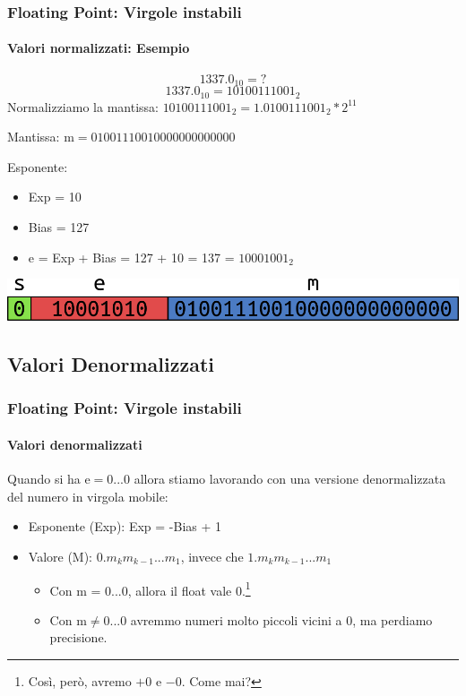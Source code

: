 \documentclass{beamer}
\begin{document}
	  \begin{frame}
	    \frametitle{Floating Point: Virgole instabili}
	    \framesubtitle{Valori normalizzati: Esempio}
	    		$$1337.0_{10} = ?$$
	    		\vspace{1em}
	    		\pause
	    		$$1337.0_{10} = 10100111001_{2}$$
	    		Normalizziamo la mantissa: $10100111001_{2} = 1.0100111001_{2}*2^{11}$
	    	  
	    	  Mantissa: $\text{m} = 01001110010000000000000$
	    	  
	    	  Esponente:
	    	  \begin{itemize}
	    	  		\item Exp = 10
	    	  		\item Bias = 127
	    	  		\item e = Exp + Bias = 127 + 10 = 137 = $10001001_{2}$
	    	  \end{itemize}
	    	  
	    	  \vspace{1em}
	    	  \pause
	    	  \begin{center}
					\includegraphics[width=.8\textwidth]{IMGs/SingleExample.png}
				\end{center}
	  \end{frame}
  \subsection{Valori Denormalizzati}
	  \begin{frame}
	    \frametitle{Floating Point: Virgole instabili}
	    \framesubtitle{Valori denormalizzati}
	    Quando si ha $\text{e} = 0\text{...}0$ allora stiamo lavorando con una versione
	    denormalizzata del numero in virgola mobile:
	    
	    \begin{itemize}
	      \item Esponente (Exp): Exp = -Bias + 1
	      \item Valore (M): $0.m_{k}m_{k-1}...m_{1}$, invece che $1.m_{k}m_{k-1}...m_{1}$      
	        \begin{itemize}
	      			\item Con m = 0...0, allora il float vale 0.\footnote{Così, però, avremo $+0$ e $-0$. Come mai?}
	      			\item Con $\text{m} \neq 0\text{...}0$ avremmo numeri molto piccoli vicini a 0, ma perdiamo precisione.
	      		\end{itemize}
	    \end{itemize}
	  \end{frame}
\end{document}
